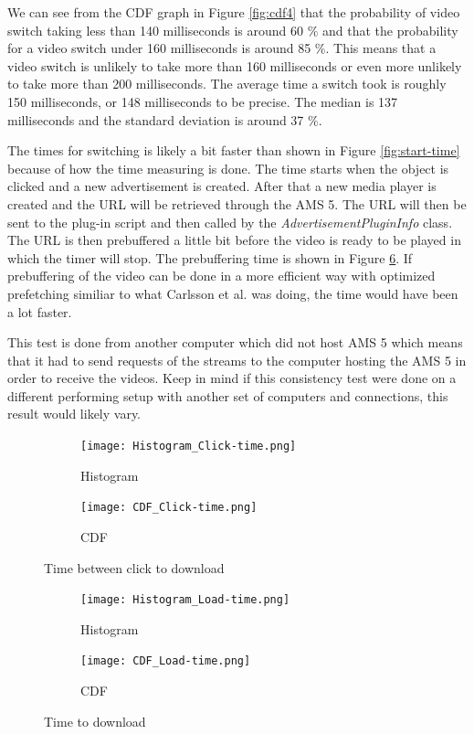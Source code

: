 We can see from the CDF graph in Figure \ref{fig:cdf4} that the probability of video switch taking less than 140 milliseconds is around 60 $\%$ and that the probability for a video switch under 160 milliseconds is around 85 $\%$. This means that a video switch is unlikely to take more than 160 milliseconds or even more unlikely to take more than 200 milliseconds.  The average time a switch took is roughly 150 milliseconds, or 148 milliseconds to be precise. The median is 137 milliseconds and the standard deviation is around 37 $\%$.

The times for switching is likely a bit faster than shown in Figure \ref{fig:start-time} because of how the time measuring is done. The time starts when the object is clicked and a new advertisement is created. After that a new media player is created and  the URL will be retrieved through the AMS 5. The URL will then be sent to the plug-in script and then called by the \textit{AdvertisementPluginInfo} class. The URL is then prebuffered a little bit before the video is ready to be played in which the timer will stop. The prebuffering time is shown in Figure \ref{fig:load-time}. If prebuffering of the video can be done in a more efficient way with optimized prefetching similiar to what Carlsson et al. \cite{optimizedstreaming} was doing, the time would have been a lot faster. 

This test is done from another computer which did not host AMS 5 which means that it had to send requests of the streams to the computer hosting the AMS 5 in order to receive the videos. Keep in mind if this consistency test were done on a different performing setup with another set of computers and connections, this result would likely vary.

\hspace*{-2cm}
\begin{figure}[!ht]
\begin{subfigure}[b]{0.5\textwidth}
 	\texttt{[image: Histogram\_Click-time.png]}
  	\caption{Histogram}\label{fig:histogram}
    \end{subfigure}\hfill 
    \hspace{3px}
    \begin{subfigure}[b]{0.5\textwidth}
	 \texttt{[image: CDF\_Click-time.png]}
 	\caption{CDF}\label{fig:cdf}
    \end{subfigure}
	\caption{Time between click to download}
	\label{fig:click-time}
\end{figure}

\begin{figure}
\begin{subfigure}[b]{0.5\textwidth}
 	\texttt{[image: Histogram\_Load-time.png]}
  	\caption{Histogram}\label{fig:histogram2}
    \end{subfigure}\hfill 
    \hspace{3px}
    \begin{subfigure}[b]{0.5\textwidth}
	 \texttt{[image: CDF\_Load-time.png]}
 	\caption{CDF}\label{fig:cdf2}
    \end{subfigure}
	\caption{Time to download}
	\label{fig:load-time}
\end{figure}

